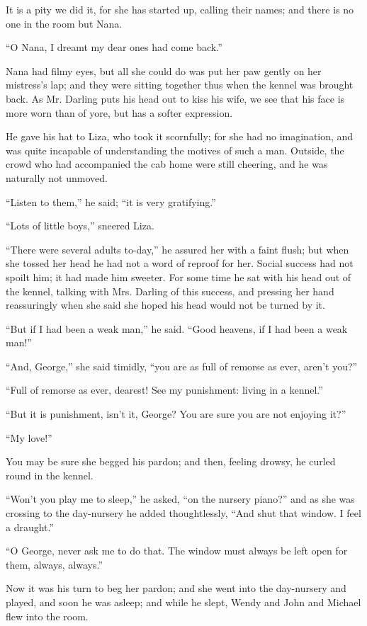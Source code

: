 It is a pity we did it, for she has started up, calling their names;
and there is no one in the room but Nana.

``O Nana, I dreamt my dear ones had come back.''

Nana had filmy eyes, but all she could do was put her paw gently on her
mistress's lap; and they were sitting together thus when the kennel was
brought back. As Mr. Darling puts his head out to kiss his wife, we see
that his face is more worn than of yore, but has a softer expression.

He gave his hat to Liza, who took it scornfully; for she had no
imagination, and was quite incapable of understanding the motives of
such a man. Outside, the crowd who had accompanied the cab home were
still cheering, and he was naturally not unmoved.

``Listen to them,'' he said; ``it is very gratifying.''

``Lots of little boys,'' sneered Liza.

``There were several adults to-day,'' he assured her with a faint flush;
but when she tossed her head he had not a word of reproof for her.
Social success had not spoilt him; it had made him sweeter. For some
time he sat with his head out of the kennel, talking with Mrs. Darling
of this success, and pressing her hand reassuringly when she said she
hoped his head would not be turned by it.

``But if I had been a weak man,'' he said. ``Good heavens, if I had been a
weak man!''

``And, George,'' she said timidly, ``you are as full of remorse as ever,
aren't you?''

``Full of remorse as ever, dearest! See my punishment: living in a
kennel.''

``But it is punishment, isn't it, George? You are sure you are not
enjoying it?''

``My love!''

You may be sure she begged his pardon; and then, feeling drowsy, he
curled round in the kennel.

``Won't you play me to sleep,'' he asked, ``on the nursery piano?'' and as
she was crossing to the day-nursery he added thoughtlessly, ``And shut
that window. I feel a draught.''

``O George, never ask me to do that. The window must always be left open
for them, always, always.''

Now it was his turn to beg her pardon; and she went into the
day-nursery and played, and soon he was asleep; and while he slept,
Wendy and John and Michael flew into the room.

